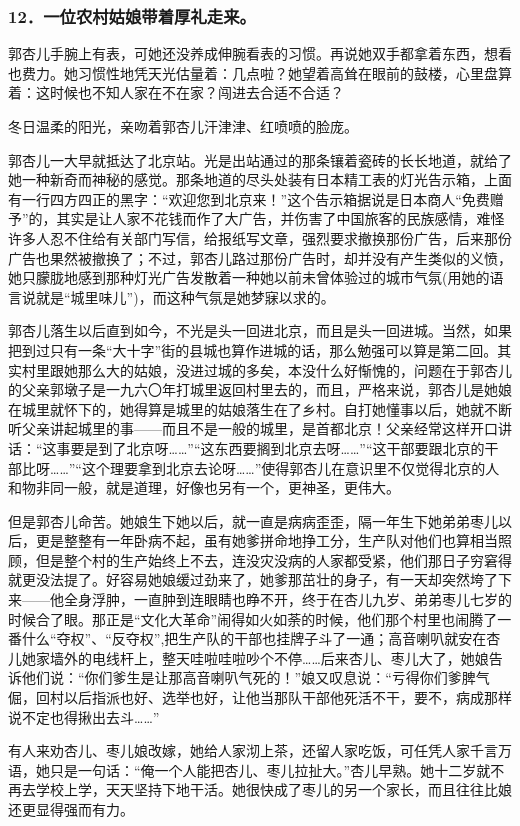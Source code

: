\subsubsection*{12．一位农村姑娘带着厚礼走来。}
\par 郭杏儿手腕上有表，可她还没养成伸腕看表的习惯。再说她双手都拿着东西，想看也费力。她习惯性地凭天光估量着：几点啦？她望着高耸在眼前的鼓楼，心里盘算着：这时候也不知人家在不在家？闯进去合适不合适？
\par 冬日温柔的阳光，亲吻着郭杏儿汗津津、红喷喷的脸庞。
\par 郭杏儿一大早就抵达了北京站。光是出站通过的那条镶着瓷砖的长长地道，就给了她一种新奇而神秘的感觉。那条地道的尽头处装有日本精工表的灯光告示箱，上面有一行四方四正的黑字：“欢迎您到北京来！”这个告示箱据说是日本商人“免费赠予”的，其实是让人家不花钱而作了大广告，并伤害了中国旅客的民族感情，难怪许多人忍不住给有关部门写信，给报纸写文章，强烈要求撤换那份广告，后来那份广告也果然被撤换了；不过，郭杏儿路过那份广告时，却并没有产生类似的义愤，她只朦胧地感到那种灯光广告发散着一种她以前未曾体验过的城市气氛(用她的语言说就是“城里味儿”)，而这种气氛是她梦寐以求的。
\par 郭杏儿落生以后直到如今，不光是头一回进北京，而且是头一回进城。当然，如果把到过只有一条“大十字”街的县城也算作进城的话，那么勉强可以算是第二回。其实村里跟她那么大的姑娘，没进过城的多矣，本没什么好惭愧的，问题在于郭杏儿的父亲郭墩子是一九六〇年打城里返回村里去的，而且，严格来说，郭杏儿是她娘在城里就怀下的，她得算是城里的姑娘落生在了乡村。自打她懂事以后，她就不断听父亲讲起城里的事——而且不是一般的城里，是首都北京！父亲经常这样开口讲话：“这事要是到了北京呀……”“这东西要搁到北京去呀……”“这干部要跟北京的干部比呀……”“这个理要拿到北京去论呀……”使得郭杏儿在意识里不仅觉得北京的人和物非同一般，就是道理，好像也另有一个，更神圣，更伟大。
\par 但是郭杏儿命苦。她娘生下她以后，就一直是病病歪歪，隔一年生下她弟弟枣儿以后，更是整整有一年卧病不起，虽有她爹拼命地挣工分，生产队对他们也算相当照顾，但是整个村的生产始终上不去，连没灾没病的人家都受紧，他们那日子穷窘得就更没法提了。好容易她娘缓过劲来了，她爹那茁壮的身子，有一天却突然垮了下来——他全身浮肿，一直肿到连眼睛也睁不开，终于在杏儿九岁、弟弟枣儿七岁的时候合了眼。那正是“文化大革命”闹得如火如荼的时候，他们那个村里也闹腾了一番什么“夺权”、“反夺权”,把生产队的干部也挂牌子斗了一通；高音喇叭就安在杏儿她家墙外的电线杆上，整天哇啦哇啦吵个不停……后来杏儿、枣儿大了，她娘告诉他们说：“你们爹生是让那高音喇叭气死的！”娘又叹息说：“亏得你们爹脾气倔，回村以后指派也好、选举也好，让他当那队干部他死活不干，要不，病成那样说不定也得揪出去斗……”
\par 有人来劝杏儿、枣儿娘改嫁，她给人家沏上茶，还留人家吃饭，可任凭人家千言万语，她只是一句话：“俺一个人能把杏儿、枣儿拉扯大。”杏儿早熟。她十二岁就不再去学校上学，天天坚持下地干活。她很快成了枣儿的另一个家长，而且往往比娘还更显得强而有力。
